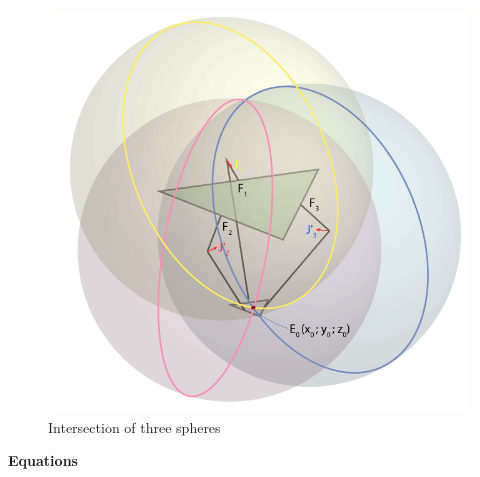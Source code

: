 \begin{figure}[H]
	\centering
	\includegraphics[width=\maxwidth{11cm}, keepaspectratio]{Chapters/Fig/intersection_of_three_spheres.png}
	\caption{Intersection of three spheres}
	\label{fig:intersection_of_three_spheres}
\end{figure}

\textbf{Equations} \\

